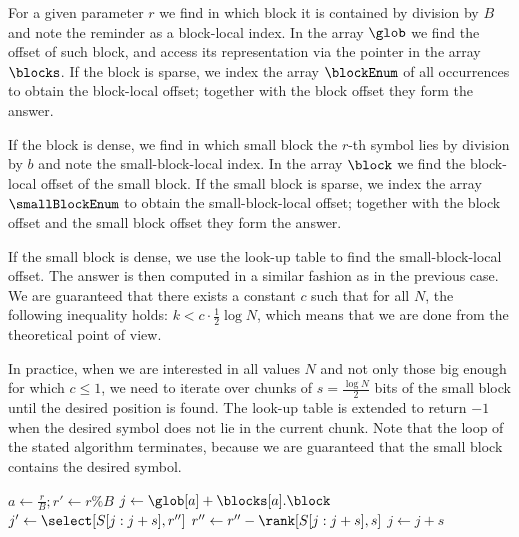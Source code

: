 For a given parameter $r$ we find in which block it is contained by division by $B$ and note the reminder as a block-local index.
In the array $\glob$ we find the offset of such block, and access its representation via the pointer in the array $\blocks$.
If the block is sparse, we index the array $\blockEnum$ of all occurrences to obtain the block-local offset; together with the block offset they form the answer.

If the block is dense, we find in which small block the $r$-th symbol \ph{} lies by division by $b$ and note the small-block-local index.
In the array $\block$ we find the block-local offset of the small block.
If the small block is sparse, we index the array $\smallBlockEnum$ to obtain the small-block-local offset; together with the block offset and the small block offset they form the answer.

If the small block is dense, we use the look-up table to find the small-block-local offset.
The answer is then computed in a similar fashion as in the previous case.
We are guaranteed that there exists a constant $c$ such that for all $N$, the following inequality holds: $k < c \cdot \frac{1}{2} \log N$, which means that we are done from the theoretical point of view.

In practice, when we are interested in all values $N$ and not only those big enough for which $c \le 1$, we need to iterate over chunks of $s = \frac{\log N}{2}$ bits of the small block until the desired position is found.
The look-up table is extended to return $-1$ when the desired symbol does not lie in the current chunk.
Note that the loop of the stated algorithm terminates, because we are guaranteed that the small block contains the desired symbol.

\begin{algorithm}
\begin{algorithmic}
	\State $a \gets \frac{r}{B}; r' \gets r \% B$
		\State {}
	\Else
		\State $j \gets \glob[a] + \blocks[a].\block$
			\State {}
		\Else
			\While{$\true$}
				\State $j' \gets \select[S[j : j + s], r'']$
					\State $r'' \gets r'' - \rank[S[j : j + s], s]$
					\State $j \gets j + s$
				\Else
					\State {}
				\EndIf
			\EndWhile
		\EndIf
	\EndIf
\EndFunction
\end{algorithmic}
\end{algorithm}


